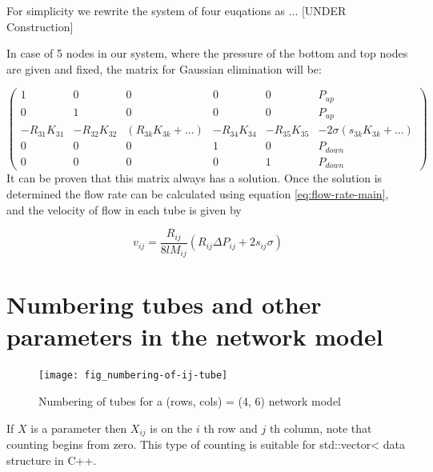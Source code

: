 	For simplicity we rewrite the system of four euqations as ... [UNDER Construction]
	
	
	In case of 5 nodes in our system, where the pressure of the bottom and top nodes are given and fixed, the matrix for Gaussian elimination will be:

	\[ 
	\begin{pmatrix}
		1 & 0 & 0 & 0 & 0 & P_{up}\\
		0 & 1 & 0 & 0 & 0 & P_{up}\\
		-R_{31}K_{31} & -R_{32}K_{32} & (R_{3k}K_{3k} + ...) & -R_{34}K_{34} & -R_{35}K_{35} & -2\sigma(s_{3k}K_{3k} + ...)\\
		0 & 0 & 0 & 1 & 0 & P_{down}\\
		0 & 0 & 0 & 0 & 1 & P_{down}
	\end{pmatrix}
	\]
	 It can be proven that this matrix always has a solution. Once the solution is determined the flow rate can be calculated using equation \ref{eq:flow-rate-main}, and the velocity of flow in each tube is given by
	 
	\begin{equation} \label{eq:velocity-in-tube}
		\boxed{v_{ij} = \frac{R_{ij}}{8lM_{ij}}(R_{ij}\Delta P_{ij} + 2s_{ij}\sigma)}
	\end{equation}
	
	
\section{Numbering tubes and other parameters in the network model}

	\begin{figure}[H]
		\texttt{[image: fig\_numbering-of-ij-tube]}
		\caption{Numbering of tubes for a (rows, cols) = (4, 6) network model}
		\label{fig_numbering-of-ij-tube}
	\end{figure}
	
	If $X$ is a parameter then $X_{ij}$ is on the $i$ th row and $j$ th column, note that counting begins from zero. This type of counting is suitable for std::vector< data structure in C++.	
